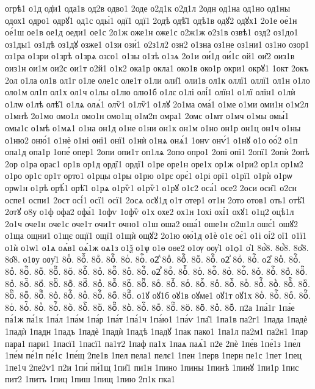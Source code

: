 {огрѣ1
о1д
од̾и1
ода1в
од2в
одво1
2оде
о2д1к
о2д1л
2одн
од1на
од1но
од1ны
одох1
одро1
одрꙋ1
од1с
оды́1
одї1
одї1
2одѣ
одѣ̑1
одѣ1в
одꙋ2
одꙋх1
2о1е
ое́1н
ое́1ш
ое1в
ое1д
оеди1
ое1с
2о1ж
оже1н
оже1с
о2ж1ж
о2з1в
озвѣ1
озд2
оз1до1
оз1ды1
оз1дѣ
оз1дꙋ
озже1
о1зи
ози́1
о2з1л2
озн2
о1зна
оз1не
оз1ни1
оз1но
озор1
оз1ра
о1зри
о1зрѣ
о1зрѧ
озсо1
о1зы
о1зѣ
о1зѧ
2о1и
ои́1д
ои́1с
ой1
ои̑2
оиз1в
оиз1н
ои1м
ои2с
ои1т
о2й1
о1к2
ока1р
окла1
око1в
око1р
окри1
окрꙋ1
1окт
2окъ
2ол
о1ла
ол1в
ол1г
о1ле
оле1с
оле1т
о1ли
оли̑1
оли1в
ол1к
оллї1
оллї1
ол1н
о1ло
оло1м
ол1п
ол1х
ол1ч
о1лы
о1лю
олю1б
о1лє
о1лі
олі́1
олїн1
о1лї
олїн1
о1лѝ
о1лѡ
о1лѣ
олѣ̑1
о1лѧ
олѧ́1
олѷ1
о1лѷ1
о1лꙋ
2о1ма
ома́1
о1ме
о1ми
оми1н
о1м2л
о1мнѣ
2о1мо
омо1л
омо1н
омо1щ
о1м2п
омра1
2омс
о1мт
о1мч
о1мы
омы́1
омы1с
о1мѣ
о1мѧ1
о1на
он1д
о1не
о1ни
он1к
он1м
о1но
он1р
он1ц
он1ч
о1ны
о1ню2
оню́1
о1нѐ
о1ні
онї1
онї1
о1нѝ
о1нѧ
онѧ́1
1онѵ
онѵ́1
о1нꙋ
о1о
оо́2
о1п
опа1д
опа1р
1опе́
опер1
2опи
опи1т
оп1лѧ
2опо
опро1
2опі
опї1
2опї1
2опѝ
2опѣ
2ор
о1ра
орас1
ор1в
ор1д
ордї1
ордї1
о1ре
оре1н
оре1х
ор1ж
о1ри2
ор1л
ор1м2
о1ро
ор1с
ор1т
орто1
о1рцы
о1ры
о1рю
о1рє
орє́1
о1рі
орї1
о1рї1
о1рѝ
о1рѡ
орѡ1н
о1рѣ
орѣ́1
орѣ̑1
о1рѧ
о1рѷ1
о1рѷ1
о1рꙋ
о1с2
оса́1
осе2
2оси
оси̑1
о2сн
оспе1
оспи1
2ост
осі́1
осї1
осї1
2осѧ
осꙋ1д
о1т
отер1
от1н
2ото
отов1
оть1
отѣ̑1
2отꙋ
о8у
о1ф
офа2
офа́1
1офѵ
1офѷ
о1х
охе2
ох1н
1охі
охі́1
охꙋ1
о1ц2
оцѣ1л
2о1ч
оче1н
оче1с
оче1т
очи1т
очно1
о1ш
оша2
оша́1
оше1н
о2ш1л
ошє́1
ошꙋ2
о1ща
ощни1
о1щє
ощї1
ощї1
о1щѝ
ощꙋ2
2о1ю
ою́1д
о1ѐ
о1є
оє́1
о1і
оі́2
ої1
о1ї1
о1ѝ
о1ѡ1
о1ѧ
оѧ́в1
оѧ́1ж
оѧ1з
о1ѯ
о1ѱ
о1ѳ
оѳе2
о1ѹ
оѹ҆1
о1ѻ1
о҆1
8о҆̀8.
8о҆́8.
8о҆̈8.
8о҆̑8.
о1ᲂу
оᲂу҆1
8оⷠ.
8оⷠ҇.
8оⷡ.
8оⷡ҇.
8оⷢ.
8оⷢ҇.
о2ⷣ
8оⷣ.
8оⷣ҇.
8оⷤ.
8оⷤ҇.
о2ⷥ
8оⷥ.
8оⷥ҇.
о2ⷦ
8оⷦ.
8оⷦ҇.
8оⷧ.
8оⷧ҇.
8оⷨ.
8оⷨ҇.
8оⷩ.
8оⷩ҇.
8оⷪ.
8оⷪ҇.
8оⷫ.
8оⷫ҇.
о2ⷬ
8оⷬ.
8оⷬ҇.
8оⷭ.
8оⷭ҇.
8оⷮ.
8оⷮ҇.
8оⷯ.
8оⷯ҇.
8оⷰ.
8оⷰ҇.
8оⷱ.
8оⷱ҇.
8оⷲ.
8оⷲ҇.
8оⷳ.
8оⷳ҇.
8оⷴ.
8оⷴ҇.
8оⷵ.
8оⷵ҇.
8оⷶ.
8оⷶ҇.
8оⷷ.
8оⷷ҇.
8оⷸ.
8оⷸ҇.
8оⷹ.
8оⷹ҇.
8оⷺ.
8оⷺ҇.
8оⷻ.
8оⷻ҇.
8оⷼ.
8оⷼ҇.
8оⷽ.
8оⷽ҇.
8оⷾ.
8оⷾ҇.
8оⷿ.
8оⷿ҇.
о1ꙋ
оꙋ1б
оꙋ1в
оꙋме1
оꙋ1т
оꙋ1х
8оꙴ.
8оꙴ҇.
8оꙵ.
8оꙵ҇.
8оꙶ.
8оꙶ҇.
8оꙷ.
8оꙷ҇.
8оꙸ.
8оꙸ҇.
8оꙹ.
8оꙹ҇.
8оꙺ.
8оꙺ҇.
8оꙻ.
8оꙻ҇.
8о꙼.
8о꙼҇.
8о꙽.
8о꙽҇.
п2а
1па́1г
1па́е
па́1ж
па́1к
1па́л
1па́м
1па́р
1па́т
1па́1ч
1па́ю1
1па́ѵ
1па̑1
1па1в
па2г1
1пада
1падѐ
1падѝ
1падн
1падъ
1падѐ
1падѝ
1падѣ
1падꙋ
1пак
пако1
1па1л
па2м1
па2н1
1пар
пара1
пари1
1пасї1
1пасї1
па1т2
1паф
па1х
1паѧ
паѧ́1
п2е
2пѐ
1пе́в
1пе́1з
1пе́л
1пе́м
пе́1п
пе́1с
1пе́щ
2пе1в
1пел
пела1
пелє1
1пен
1перв
1перн
пе1с
1пет
1пец
1пе1ч
2пе2ѵ1
п2и
1пи́
пи́1щ
1пи̑1
пи1н
1пино
1пины
1пинѣ
1пинꙋ
1пи1р
1пис
пит2
1питъ
1пиц
1пиш
1пищ
1пию
2п1к
пка1
}
